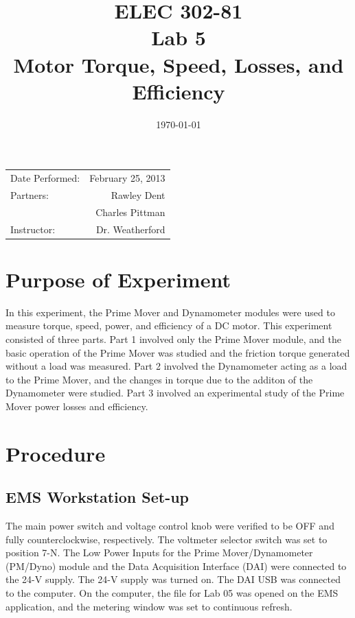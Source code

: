 \documentclass{article}
\author{}
\title{ELEC 302-81\\ Lab 5\\ Motor Torque, Speed, Losses, and Efficiency}
\date{\today}
\begin{document}
\maketitle

\begin{center}
  \begin{tabular}{lr}
    Date Performed: & February 25, 2013 \\
    Partners: & Rawley Dent \\
              & Charles Pittman \\
    Instructor: & Dr. Weatherford
  \end{tabular}
\end{center}

\pagebreak

\setlength\parindent{0pt}

\section{Purpose of Experiment}

In this experiment, the Prime Mover and Dynamometer modules were used to measure torque, speed, 
power, and efficiency of a DC motor. This experiment consisted of three parts. Part 1 involved 
only the Prime Mover module, and the basic operation of the Prime Mover was studied and the 
friction torque generated without a load was measured. Part 2 involved the Dynamometer acting as
a load to the Prime Mover, and the changes in torque due to the additon of the Dynamometer were 
studied. Part 3 involved an experimental study of the Prime Mover power losses and efficiency.

\section{Procedure}

\subsection{EMS Workstation Set-up}
The main power switch and voltage control knob were verified to be OFF and fully counterclockwise,
respectively. The voltmeter selector switch was set to position 7-N. The Low Power Inputs for the 
Prime Mover/Dynamometer (PM/Dyno) module and the Data Acquisition Interface (DAI) were connected to the 24-V
supply. The 24-V supply was turned on. The DAI USB was connected to the computer. On the computer,
the file for Lab 05 was opened on the EMS application, and the metering window was set to continuous
refresh.
\end{document}
